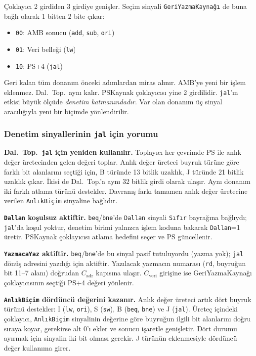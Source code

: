 Çoklayıcı 2 girdiden 3 girdiye genişler. Seçim sinyali \texttt{GeriYazmaKaynağı} de buna bağlı olarak 1 bitten 2 bite çıkar:
\begin{itemize}
    \item \texttt{00}: AMB sonucu (\texttt{add}, \texttt{sub}, \texttt{ori})
    \item \texttt{01}: Veri belleği (\texttt{lw})
    \item \texttt{10}: PS+4 (\texttt{jal})
\end{itemize}

Geri kalan tüm donanım önceki adımlardan miras alınır. AMB'ye yeni bir işlem eklenmez. Dal.\ Top.\ aynı kalır. PSKaynak çoklayıcısı yine 2 girdilidir. \texttt{jal}'ın etkisi büyük ölçüde \emph{denetim katmanındadır}. Var olan donanım üç sinyal aracılığıyla yeni bir biçimde yönlendirilir.

\subsubsection*{Denetim sinyallerinin \texttt{jal} için yorumu}

\textbf{Dal.\ Top.\ \texttt{jal} için yeniden kullanılır.} Toplayıcı her çevrimde PS ile anlık değer üretecinden gelen değeri toplar. Anlık değer üreteci buyruk türüne göre farklı bit alanlarını seçtiği için, B türünde 13 bitlik uzaklık, J türünde 21 bitlik uzaklık çıkar. İkisi de Dal.\ Top.'a aynı 32 bitlik girdi olarak ulaşır. Aynı donanım iki farklı atlama türünü destekler. Davranış farkı tamamen anlık değer üretecine verilen \texttt{AnlıkBiçim} sinyaline bağlıdır.

\textbf{\texttt{Dallan} koşulsuz aktiftir.} \texttt{beq}/\texttt{bne}'de \texttt{Dallan} sinyali \texttt{Sıfır} bayrağına bağlıydı; \texttt{jal}'da koşul yoktur, denetim birimi yalnızca işlem koduna bakarak \texttt{Dallan}=1 üretir. PSKaynak çoklayıcısı atlama hedefini seçer ve PS güncellenir.

\textbf{\texttt{YazmacaYaz} aktiftir.} \texttt{beq}/\texttt{bne}'de bu sinyal pasif tutuluyordu (yazma yok); \texttt{jal} dönüş adresini yazdığı için aktiftir. Yazılacak yazmacın numarası (\texttt{rd}, buyruğun bit 11--7 alanı) doğrudan $C_{\text{adr}}$ kapısına ulaşır. $C_{\text{veri}}$ girişine ise GeriYazmaKaynağı çoklayıcısının seçtiği PS+4 değeri yönlenir.

\textbf{\texttt{AnlıkBiçim} dördüncü değerini kazanır.} Anlık değer üreteci artık dört buyruk türünü destekler: I (\texttt{lw}, \texttt{ori}), S (\texttt{sw}), B (\texttt{beq}, \texttt{bne}) ve J (\texttt{jal}). Üreteç içindeki çoklayıcı, \texttt{AnlıkBiçim} sinyalinin değerine göre buyruğun ilgili bit alanlarını doğru sıraya koyar, gerekirse alt 0'ı ekler ve sonucu işaretle genişletir. Dört durumu ayırmak için sinyalin iki bit olması gerekir. J türünün eklenmesiyle dördüncü değer kullanıma girer.

